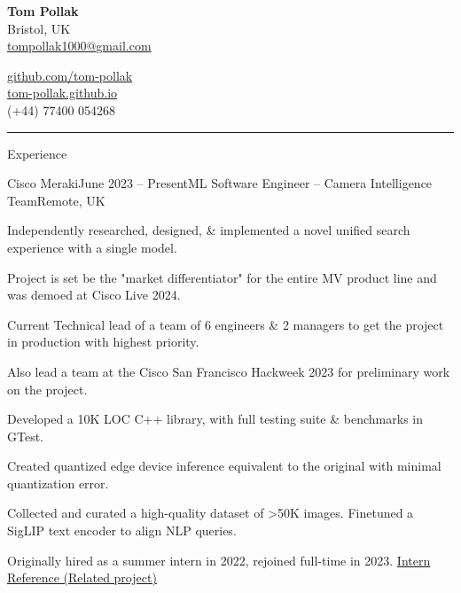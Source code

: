\documentclass{structure}
\begin{document}
\parbox{0.5\textwidth}{
    {\namesize\textbf{Tom Pollak}} \\[6pt]
    Bristol, UK\\
    \href{mailto:tompollak1000@gmail.com}{tompollak1000@gmail.com}
}
\hfill
\parbox{0.5\textwidth}{
    \vspace*{10pt}

    \begin{flushright}

        \href{https://github.com/tom-pollak}{github.com/tom-pollak} \\
        \href{https://tom-pollak.github.io}{tom-pollak.github.io} \\
        (+44) 77400 054268
    \end{flushright}

}

\smallskip
\hrule
\smallskip


\begin{rSection}{Experience}

    \begin{rSubsection}{Cisco Meraki}{June 2023 -- Present}{ML Software Engineer -- Camera Intelligence Team}{Remote, UK}{}{}
        \item Independently researched, designed, \& implemented a novel unified search experience with a single model.
        \item Project is set be the "market differentiator" for the entire MV product line and was demoed at Cisco Live 2024.
        \item Current Technical lead of a team of 6 engineers \& 2 managers to get the project in production with highest priority.
        \item Also lead a team at the Cisco San Francisco Hackweek 2023 for preliminary work on the project.
        \item Developed a 10K LOC C++ library, with full testing suite \& benchmarks in GTest.
        \item Created quantized edge device inference equivalent to the original with minimal quantization error.
        \item Collected and curated a high-quality dataset of >50K images. Finetuned a SigLIP text encoder to align NLP queries.
        \item Originally hired as a summer intern in 2022, rejoined full-time in 2023. \href{https://gist.githubusercontent.com/tom-pollak/1a2e8c1fc61ba269e25c73c02c78007c/raw/45c8cbceda8cd745d6d00cb16a09979778df663b/gistfile1.txt}{{\color{blue}Intern Reference} (Related project)}
    \end{rSubsection}

\end{rSection}
\end{document}
